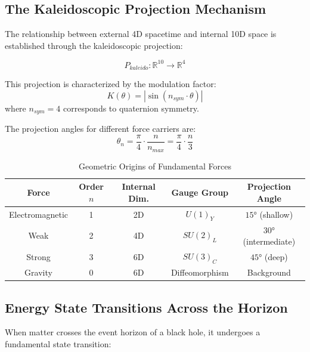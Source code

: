 \subsection{The Kaleidoscopic Projection Mechanism}

The relationship between external 4D spacetime and internal 10D space is established through the kaleidoscopic projection:

\begin{equation}
    P_{kaleido}: \mathbb{R}^{10} \to \mathbb{R}^4
    \label{eq:kaleidoscopic_projection}
\end{equation}

This projection is characterized by the modulation factor:
\begin{equation}
    K(\theta) = |\sin(n_{sym} \cdot \theta)|
    \label{eq:kaleidoscope_factor}
\end{equation}
where $n_{sym} = 4$ corresponds to quaternion symmetry.

The projection angles for different force carriers are:
\begin{equation}
    \theta_n = \frac{\pi}{4} \cdot \frac{n}{n_{max}} = \frac{\pi}{4} \cdot \frac{n}{3}
    \label{eq:projection_angles}
\end{equation}

\begin{table}[htbp]
\centering
\caption{Geometric Origins of Fundamental Forces}
\begin{tabular}{@{}ccccc@{}}
\hline
Force & Order $n$ & Internal Dim. & Gauge Group & Projection Angle \\
\hline
Electromagnetic & 1 & 2D & $U(1)_Y$ & $15°$ (shallow) \\
Weak & 2 & 4D & $SU(2)_L$ & $30°$ (intermediate) \\
Strong & 3 & 6D & $SU(3)_C$ & $45°$ (deep) \\
Gravity & 0 & 6D & Diffeomorphism & Background \\
\hline
\end{tabular}
\label{tab:force_origins}
\end{table}

\subsection{Energy State Transitions Across the Horizon}

When matter crosses the event horizon of a black hole, it undergoes a fundamental state transition:

